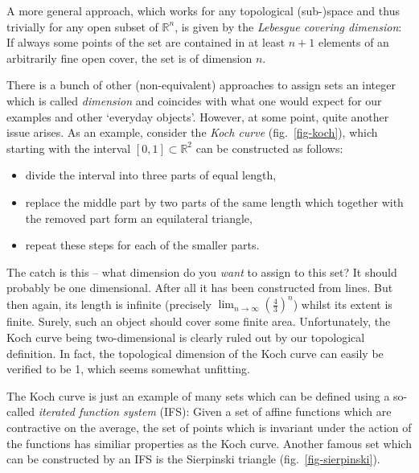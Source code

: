 \documentclass[twocolumn, 10pt]{scrartcl}
\begin{document}
            A more general approach, which works for any topological (sub-)space and thus trivially for any open subset
            of $\mathbb{R}^n$, is given by the \emph{Lebesgue covering dimension}: If always some points of the set are
            contained in at least $n+1$ elements of an arbitrarily fine open cover, the set is of dimension $n$.

            There is a bunch of other (non-equivalent) approaches to assign sets an integer which is called
            \emph{dimension} and coincides with what one would expect for our examples and other `everyday objects'.
            However, at some point, quite another issue arises. As an example, consider the \emph{Koch curve}
            (fig.~\ref{fig-koch}), which starting with the interval $\left[0,1\right]\subset\mathbb{R}^2$ can be
            constructed as follows:
            \begin{itemize}
                \item divide the interval into three parts of equal length,
                \item replace the middle part by two parts of the same length which together with the removed part
                    form an equilateral triangle,
                \item repeat these steps for each of the smaller parts.
            \end{itemize}

            The catch is this -- what dimension do you \emph{want} to assign to this set? It should probably be
            one dimensional. After all it has been constructed from lines. But then again, its length is infinite
            (precisely $\lim_{n\rightarrow\infty}\left(\frac{4}{3}\right)^n$) whilst its extent is finite. Surely, such
            an object should cover some finite area. Unfortunately, the Koch curve being two-dimensional is clearly
            ruled out by our topological definition. In fact, the topological dimension of the Koch curve can easily be
            verified to be 1, which seems somewhat unfitting.

            The Koch curve is just an example of many sets which can be defined using a so-called
            \emph{iterated function system} (IFS): Given a set of affine
            functions which are contractive on the average, the set of points which is invariant under the action
            of the functions has similiar properties as the Koch curve. Another famous set which can be constructed by
            an IFS is the Sierpinski triangle (fig.~\ref{fig-sierpinski}).
\end{document}
